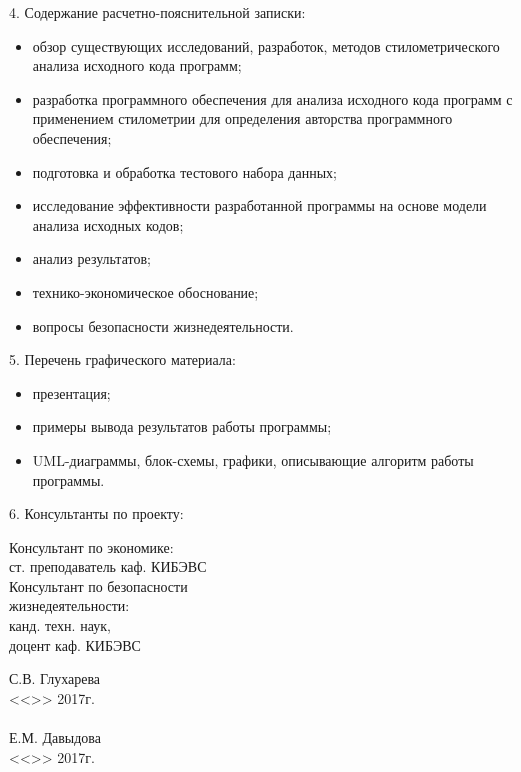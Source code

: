 4. Содержание расчетно-пояснительной записки:
\begin{itemize}
 \item обзор существующих исследований, разработок, методов стилометрического анализа исходного кода программ;
 \item разработка программного обеспечения для анализа исходного кода программ с применением стилометрии для определения авторства программного обеспечения;
 \item подготовка и обработка тестового набора данных;
 \item исследование эффективности разработанной программы на основе модели анализа исходных кодов;
 \item анализ результатов;
 \item технико-экономическое обоснование;
 \item вопросы безопасности жизнедеятельности.
\end{itemize}

5. Перечень графического материала: 
\begin{itemize}
 \item презентация;
 \item примеры вывода результатов работы программы;
 \item UML-диаграммы, блок-схемы, графики, описывающие алгоритм работы программы.
\end{itemize}

6. Консультанты по проекту:
\vspace{0.01cm}
\begin{singlespace}
 \begin{minipage}[left]{0.40\linewidth}
 Консультант по экономике:\\
 ст. преподаватель каф. КИБЭВС \\

 Консультант по безопасности\\ жизнедеятельности:\\
 канд. техн. наук,\\ доцент каф. КИБЭВС\\
 \end{minipage}
  \hfill
 \begin{minipage}[left]{0.45\linewidth}
  \vspace{0.7cm}
 \underline{\hspace{2.5cm}}С.В. Глухарева \\
 <<\underline{\hspace{1cm}}>>\underline{\hspace{3cm}} 2017г.\\
 \vspace{0.3cm}\\ 
 \underline{\hspace{2.5cm}}Е.М. Давыдова\\
 <<\underline{\hspace{1cm}}>>\underline{\hspace{3cm}} 2017г.\\
 \end{minipage}
\end{singlespace}

